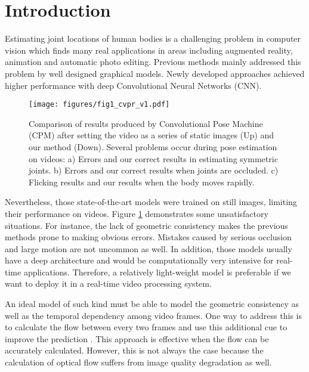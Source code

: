 \documentclass[10pt,twocolumn,letterpaper]{article}
\begin{document}
\section{Introduction}
Estimating joint locations of human bodies is a challenging problem in computer vision which finds many real applications in areas including augmented reality, animation and automatic photo editing. Previous methods \cite{and09part,felz05PS,yang13mixPCK} mainly addressed this problem by well designed graphical models. Newly developed approaches \cite{chu2017multi,new16refine,wei16refineCPM} achieved higher performance with deep Convolutional Neural Networks (CNN).

\begin{figure}
  \texttt{[image: figures/fig1\_cvpr\_v1.pdf]}
  \vspace{-20pt}
  \caption{Comparison of results produced by Convolutional Pose Machine (CPM) \cite{wei16refineCPM} after setting the video as a series of static images (Up) and our method (Down). Several problems occur during pose estimation on videos: a) Errors and our correct results in estimating symmetric joints. b) Errors and our correct results when joints are occluded. c) Flicking results and our results when the body moves rapidly.}
  \label{figure1}
  \vspace{-12pt}
\end{figure}

Nevertheless, those state-of-the-art models were trained on still images, limiting their performance on videos. Figure \ref{figure1} demonstrates some unsatisfactory situations. For instance, the lack of geometric consistency makes the previous methods prone to making obvious errors. Mistakes caused by serious occlusion and large motion are not uncommon as well. In addition, those models usually have a deep architecture and would be computationally very intensive for real-time applications. Therefore, a relatively light-weight model is preferable if we want to deploy it in a real-time video processing system.

An ideal model of such kind must be able to model the geometric consistency as well as the temporal dependency among video frames. One way to address this is to calculate the flow between every two frames and use this additional cue to improve the prediction \cite{pfister15flowadj,song17flowAdjST}. This approach is effective when the flow can be accurately calculated. However, this is not always the case because the calculation of optical flow suffers from image quality degradation as well.
\end{document}
